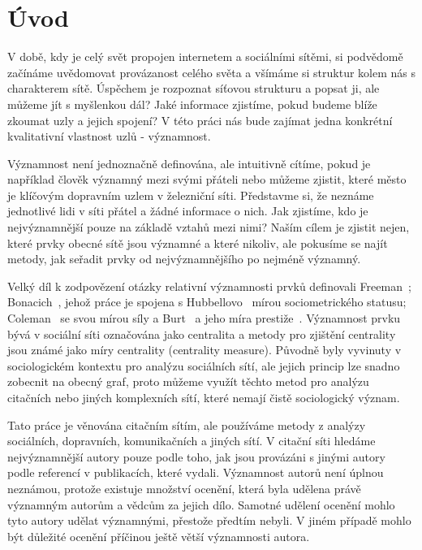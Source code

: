 \documentclass{bakalarka}
\begin{document}

\clearpage
\pagestyle{empty}
\setlength{\cftbeforetoctitleskip}{-2em}
\tableofcontents

\clearpage
\setcounter{page}{1}
\pagestyle{fancy}
\chapter{Úvod}
V době, kdy je celý svět propojen internetem a sociálními sítěmi, si podvědomě
začínáme uvědomovat provázanost celého světa a všímáme si struktur kolem nás s
charakterem sítě. Úspěchem je rozpoznat síťovou strukturu a popsat ji, ale
můžeme jít s myšlenkou dál? Jaké informace zjistíme, pokud budeme blíže zkoumat
uzly a jejich spojení? V této práci nás bude zajímat jedna konkrétní
kvalitativní vlastnost uzlů - významnost.

Významnost není jednoznačně definována, ale intuitivně cítíme, pokud je
například člověk významný mezi svými přáteli nebo můžeme zjistit, které město
je klíčovým dopravním uzlem v železniční síti.  Představme si, že neznáme
jednotlivé lidi v síti přátel a žádné informace o nich. Jak zjistíme, kdo je
nejvýznamnější pouze na základě vztahů mezi nimi? Naším cílem je zjistit nejen,
které prvky obecné sítě jsou významné a které nikoliv, ale pokusíme se najít
metody, jak seřadit prvky od nejvýznamnějšího po nejméně významný.

Velký díl k zodpovězení otázky relativní významnosti prvků definovali
Freeman~\citet{freeman1979}; Bonacich~\citet{bonacich1972}, jehož práce je
spojena s Hubbellovo~\citet{hubbell1965} mírou sociometrického statusu;
Coleman~\citet{coleman1973} se svou mírou síly a Burt~\citet{burt1982} a jeho
míra prestiže~\citet{friedkin1991}. Významnost prvku bývá v sociální síti
označována jako centralita a metody pro zjištění centrality jsou známé jako
míry centrality (centrality measure). Původně byly vyvinuty v sociologickém
kontextu pro analýzu sociálních sítí, ale jejich princip lze snadno zobecnit na
obecný graf, proto můžeme využít těchto metod pro analýzu citačních nebo jiných
komplexních sítí, které nemají čistě sociologický význam.

Tato práce je věnována citačním sítím, ale používáme metody z analýzy
sociálních, dopravních, komunikačních a jiných sítí. V citační síti hledáme
nejvýznamnější autory pouze podle toho, jak jsou provázáni s jinými autory
podle referencí v publikacích, které vydali. Významnost autorů není úplnou
neznámou, protože existuje množství ocenění, která byla udělena právě významným
autorům a vědcům za jejich dílo. Samotné udělení ocenění mohlo tyto autory
udělat významnými, přestože předtím nebyli. V jiném případě mohlo být důležité
ocenění příčinou ještě větší významnosti autora. 
\end{document}
